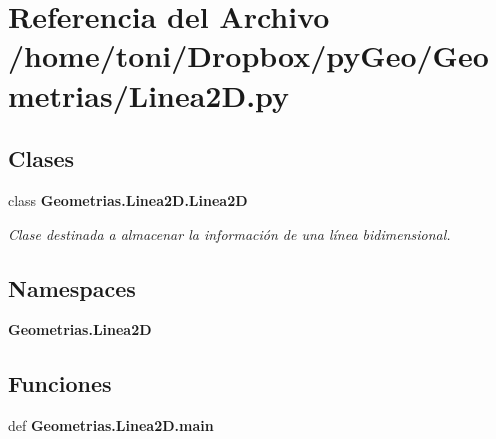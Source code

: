 \section{Referencia del Archivo /home/toni/\-Dropbox/py\-Geo/\-Geometrias/\-Linea2\-D.py}
\label{Linea2D_8py}
\subsection*{Clases}
\begin{DoxyCompactItemize}
\item 
class {\bf Geometrias.\-Linea2\-D.\-Linea2\-D}
\begin{DoxyCompactList}\small\item\em Clase destinada a almacenar la información de una línea bidimensional. \end{DoxyCompactList}\end{DoxyCompactItemize}
\subsection*{Namespaces}
\begin{DoxyCompactItemize}
\item 
{\bf Geometrias.\-Linea2\-D}
\end{DoxyCompactItemize}
\subsection*{Funciones}
\begin{DoxyCompactItemize}
\item 
def {\bf Geometrias.\-Linea2\-D.\-main}
\end{DoxyCompactItemize}
